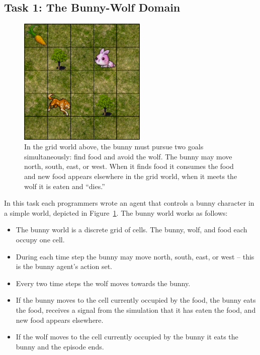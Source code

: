 \subsection{Task 1: The Bunny-Wolf Domain}\label{sec:task1}

\begin{figure}[h]

\begin{center}
\includegraphics[height=2.4in]{bunny.png}
\end{center}


\caption{In the grid world above, the bunny must pursue two goals
  simultaneously: find food and avoid the wolf.  The bunny may move
  north, south, east, or west.  When it finds food it consumes the
  food and new food appears elsewhere in the grid world, when it meets
  the wolf it is eaten and ``dies.''}
\label{fig:bunny-picture}
\end{figure}

In this task each programmers wrote an agent that controls a bunny character in a simple world, depicted in Figure~\ref{fig:bunny-picture}.  The bunny world works as follows:

\begin{itemize}

\item The bunny world is a discrete grid of cells.  The bunny, wolf, and food each occupy one cell.

\item During each time step the bunny may move north, south, east, or west -- this is the bunny agent's action set.

\item Every two time steps the wolf moves towards the bunny.

\item If the bunny moves to the cell currently occupied by the food, the bunny eats the food, receives a signal from the simulation that it has eaten the food, and new food appears elsewhere.

\item If the wolf moves to the cell currently occupied by the bunny it eats the bunny and the episode ends.

\end{itemize}

